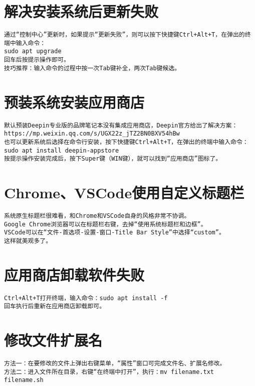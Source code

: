 \documentclass[a4paper,fontset=fandol,zihao=-4,linespread=1.2]{ctexbook}
\begin{document}
\section{解决安装系统后更新失败}
\begin{lstlisting}
通过“控制中心”更新时，如果提示“更新失败”，则可以按下快捷键Ctrl+Alt+T，在弹出的终端中输入命令：
sudo apt upgrade
回车后按提示操作即可。
技巧推荐：输入命令的过程中按一次Tab键补全，两次Tab键候选。
\end{lstlisting}

\section{预装系统安装应用商店}
\begin{lstlisting}
默认预装Deepin专业版的品牌笔记本没有集成应用商店，Deepin官方给出了解决方案：
https://mp.weixin.qq.com/s/UGX22z_jTZ2BN0BXV54hBw
也可以更新系统后选择在命令行安装，按下快捷键Ctrl+Alt+T，在弹出的终端中输入命令：
sudo apt install deepin-appstore
按提示操作安装完成后，按下Super键（WIN键），就可以找到“应用商店”图标了。
\end{lstlisting}

\section{Chrome、VSCode使用自定义标题栏}
\begin{lstlisting}
系统原生标题栏很难看，和Chrome和VSCode自身的风格非常不协调。
Google Chrome浏览器可以在标题栏右键，去掉“使用系统标题栏和边框”。
VSCode可以在“文件-首选项-设置-窗口-Title Bar Style”中选择“custom”。
这样就美观多了。
\end{lstlisting}

\section{应用商店卸载软件失败}
\begin{lstlisting}
Ctrl+Alt+T打开终端，输入命令：sudo apt install -f
回车执行后重新在应用商店卸载即可。
\end{lstlisting}

\section{修改文件扩展名}
\begin{lstlisting}
方法一：在要修改的文件上弹出右键菜单，“属性”窗口可完成文件名、扩展名修改。
方法二：进入文件所在目录，右键“在终端中打开”，执行：mv filename.txt filename.sh
\end{lstlisting}
\end{document}
